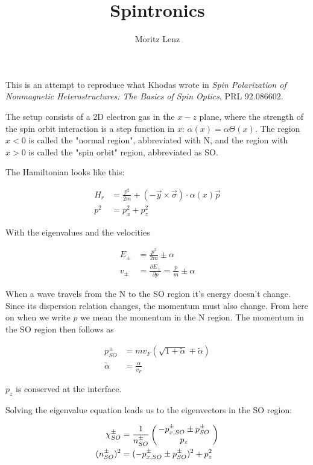 \documentclass[11pt]{article}
\author{Moritz Lenz}
\title{Spintronics}
\newcommand{\inp}[1]{\ensuremath{\left(#1\right)}}
\newcommand{\vect}[2]{\ensuremath{\inp{\hspace{-.8ex}\begin{array}{c}#1\\#2\end{array}\hspace{-.4ex}}}}
\begin{document}
\maketitle

This is an attempt to reproduce what Khodas wrote in {\em Spin 
Polarization of Nonmagnetic Heterostructures: The Basics of Spin
Optics}, PRL 92.086602.

The setup consists of a 2D electron gas in the $x-z$ plane, where the
strength of the spin orbit interaction is a step function in $x$:
$\alpha(x) = \alpha \Theta(x)$. The region $x < 0$ is called the
"normal region", abbreviated with N, and the region with $x > 0$ is
called the "spin orbit" region, abbreviated as SO.

The Hamiltonian looks like this:

\begin{align}
    H_r &= \frac{p^2}{2m} + (-\vec y \times \vec \sigma) \cdot
            \alpha(x) \vec p\\ 
    p^2 &= p_x^2 + p_z^2
\end{align}

With the eigenvalues and the velocities

\begin{align}
    E_{\pm} &= \frac{p^2}{2m} \pm \alpha \\
    v_{\pm} &= \frac{\partial E_{\pm}}{\partial p} = \frac{p}{m} \pm \alpha
\end{align}

When a wave travels from the N to the SO region it's energy doesn't
change. Since its dispersion relation changes, the momentum must also
change. From here on when we write $p$ we mean the momentum in the N
region. The momentum in the SO region then follows as

\begin{align}
    \label{eq:pso}
    p_{SO}^{\pm} &= m v_F (\sqrt{1 + \tilde \alpha} \mp \tilde \alpha) \\
    \tilde\alpha &= \frac{\alpha}{v_F}
\end{align}

$p_z$ is conserved at the interface.

Solving the eigenvalue equation leads us to the eigenvectors in the SO
region:

\begin{align*}
   \chi_{SO}^{\pm} &= \frac{1}{n_{SO}^{\pm}} 
                      \vect{-p_{x,SO}^{\pm} \pm p_{SO}^\pm}{p_z} \\
    (n_{SO}^{\pm})^2 &= (-p_{x,SO}^{\pm} \pm p_{SO}^\pm)^2 + p_z^2
\end{align*}
\end{document}
